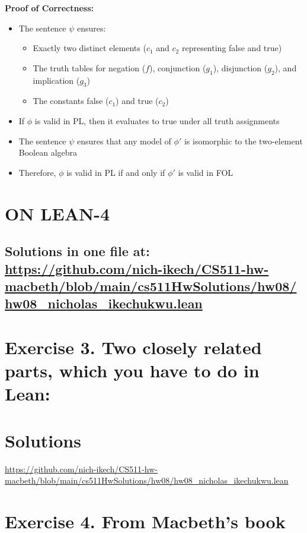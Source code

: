 \documentclass{article}
\begin{document}
\textbf{Proof of Correctness:}
\begin{itemize}
    \item The sentence $\psi$ ensures:
    \begin{itemize}
        \item Exactly two distinct elements ($c_1$ and $c_2$ representing false and true)
        \item The truth tables for negation ($f$), conjunction ($g_1$), disjunction ($g_2$), and implication ($g_3$)
        \item The constants false ($c_1$) and true ($c_2$)
    \end{itemize}
    \item If $\phi$ is valid in PL, then it evaluates to true under all truth assignments
    \item The sentence $\psi$ ensures that any model of $\phi'$ is isomorphic to the two-element Boolean algebra
    \item Therefore, $\phi$ is valid in PL if and only if $\phi'$ is valid in FOL
\end{itemize}

\newpage







\section*{ON LEAN-4}
\subsection*{Solutions in one file at: 
\url{https://github.com/nich-ikech/CS511-hw-macbeth/blob/main/cs511HwSolutions/hw08/hw08_nicholas_ikechukwu.lean}}

\newpage

\section*{Exercise 3. Two closely related parts, which you have to do in Lean:}
\section*{Solutions}
\url{https://github.com/nich-ikech/CS511-hw-macbeth/blob/main/cs511HwSolutions/hw08/hw08_nicholas_ikechukwu.lean}

\newpage

\section*{Exercise 4. From Macbeth's book}
\end{document}
